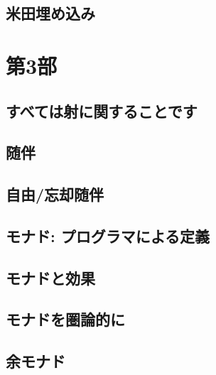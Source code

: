 \chapter{米田埋め込み}\label{yoneda-embedding}


\part*{第3部}

\chapter{すべては射に関することです}\label{all-about-morphisms}


\chapter{随伴}\label{adjunctions}


\chapter{自由/忘却随伴}\label{free-forgetful-adjunctions}


\chapter{モナド: プログラマによる定義}\label{monads-programmers-definition}


\chapter{モナドと効果}\label{monads-and-effects}


\chapter{モナドを圏論的に}\label{monads-categorically}


\chapter{余モナド}\label{comonads}


